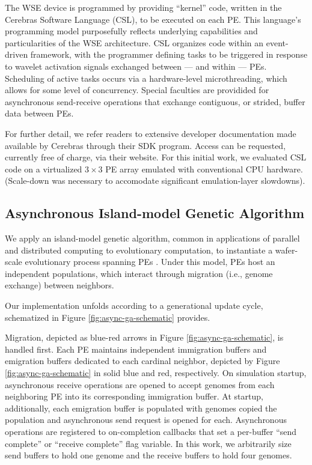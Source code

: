 The WSE device is programmed by providing ``kernel'' code, written in the Cerebras Software Language (CSL), to be executed on each PE.
This language's programming model purposefully reflects underlying capabilities and particularities of the WSE architecture.
CSL organizes code within an event-driven framework, with the programmer defining tasks to be triggered in response to wavelet activation signals exchanged between --- and within --- PEs.
Scheduling of active tasks occurs via a hardware-level microthreading, which allows for some level of concurrency.
Special faculties are providided for asynchronous send-receive operations that exchange contiguous, or strided, buffer data between PEs.

For further detail, we refer readers to extensive developer documentation made available by Cerebras through their SDK program.
Access can be requested, currently free of charge, via their website.
For this initial work, we evaluated CSL code on a virtualized $3\times3$ PE array emulated with conventional CPU hardware.
(Scale-down was necessary to accomodate significant emulation-layer slowdowns).

\subsection{Asynchronous Island-model Genetic Algorithm}

We apply an island-model genetic algorithm, common in applications of parallel and distributed computing to evolutionary computation, to instantiate a wafer-scale evolutionary process spanning PEs \citep{bennett1999building}.
Under this model, PEs host an independent populations, which interact through migration (i.e., genome exchange) between neighbors.

Our implementation unfolds according to a generational update cycle, schematized in Figure \ref{fig:async-ga-schematic} provides.

Migration, depicted as blue-red arrows in Figure \ref{fig:async-ga-schematic}, is handled first.
Each PE maintains independent immigration buffers and emigration buffers dedicated to each cardinal neighbor, depicted by Figure \ref{fig:async-ga-schematic} in solid blue and red, respectively.
On simulation startup, asynchronous receive operations are opened to accept genomes from each neighboring PE into its corresponding immigration buffer.
At startup, additionally, each emigration buffer is populated with genomes copied the population and asynchronous send request is opened for each. %
Asynchronous operations are registered to on-completion callbacks that set a per-buffer ``send complete'' or ``receive complete'' flag variable.
In this work, we arbitrarily size send buffers to hold one genome and the receive buffers to hold four genomes.

